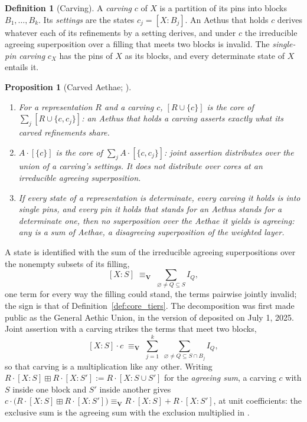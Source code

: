 \documentclass[11pt]{article}
\newtheorem{proposition}{Proposition}
\theoremstyle{definition}
\newtheorem{definition}{Definition}
\newcommand{\Aethus}{Aethus}
\begin{document}
\begin{definition}[Carving]\label{def:core_carving}
A \emph{carving} $c$ of $X$ is a partition of its pins into blocks $B_1, \ldots, B_k$. Its \emph{settings} are the states $c_j = [X : B_j]$. An \Aethus{} that holds $c$ derives whatever each of its refinements by a setting derives, and under $c$ the irreducible agreeing superposition over a filling that meets two blocks is invalid. The \emph{single-pin carving} $c_X$ has the pins of $X$ as its blocks, and every determinate state of $X$ entails it.
\end{definition}

\begin{proposition}[Carved Aethae; \cite{Aethus}]\label{prop:core_carving}
\begin{enumerate}
\item[(i)] For a representation $R$ and a carving $c$, $[R \cup \{c\}]$ is the core of $\sum_j [R \cup \{c, c_j\}]$: an \Aethus{} that holds a carving asserts exactly what its carved refinements share.
\item[(ii)] $A \cdot [\{c\}]$ is the core of $\sum_j A \cdot [\{c, c_j\}]$: joint assertion distributes over the union of a carving's settings. It does not distribute over cores at an irreducible agreeing superposition.
\item[(iii)] If every state of a representation is determinate, every carving it holds is into single pins, and every pin it holds that stands for an \Aethus{} stands for a determinate one, then no superposition over the Aethae it yields is agreeing: any is a sum of Aethae, a disagreeing superposition of the weighted layer.
\end{enumerate}
\end{proposition}

\noindent A state is identified with the sum of the irreducible agreeing superpositions over the nonempty subsets of its filling,
\begin{equation}\label{eq:core_powerset}
[X : S] \;\equiv_{\mathbf{V}}\; \sum_{\varnothing \neq Q \subseteq S} I_Q ,
\end{equation}
one term for every way the filling could stand, the terms pairwise jointly invalid; the sign is that of Definition~\ref{def:core_tiers}. The decomposition was first made public as the General Aethic Union, in the version of \cite{Aethus} deposited on July 1, 2025. Joint assertion with a carving strikes the terms that meet two blocks,
\begin{equation}\label{eq:core_carved}
[X : S] \cdot c \;\equiv_{\mathbf{V}}\; \sum_{j = 1}^{k} \; \sum_{\varnothing \neq Q \subseteq S \cap B_j} I_Q ,
\end{equation}
so that carving is a multiplication like any other. Writing $R \cdot [X : S] \boxplus R \cdot [X : S'] := R \cdot [X : S \cup S']$ for the \emph{agreeing sum}, a carving $c$ with $S$ inside one block and $S'$ inside another gives $c \cdot \bigl(R \cdot [X : S] \boxplus R \cdot [X : S']\bigr) \equiv_{\mathbf{V}} R \cdot [X : S] + R \cdot [X : S']$, at unit coefficients: the exclusive sum is the agreeing sum with the exclusion multiplied in \cite{Aethus}.
\end{document}
